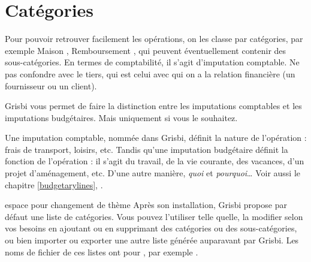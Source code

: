 
\chapter{Catégories\label{categories}}


Pour pouvoir retrouver facilement les opérations, on les classe par catégories, par exemple \og Maison \fg{}, \og Remboursement \fg{}, qui peuvent éventuellement contenir des sous-catégories. En termes de comptabilité, il s'agit d'imputation comptable. Ne pas confondre avec le tiers, qui est celui avec qui on a la relation financière (un fournisseur ou un client).

Grisbi vous permet de faire la distinction entre les imputations comptables et les imputations budgétaires. Mais uniquement si vous le souhaitez.

Une imputation comptable, nommée  dans Grisbi, définit la nature de  l'opération : frais de transport, loisirs, etc. Tandis qu'une imputation budgétaire définit la fonction de l'opération : il s'agit du travail, de la vie courante, des vacances, d'un projet d'aménagement, etc. D'une autre manière, \emph{quoi} et \emph{pourquoi}\ldots{ } Voir aussi le chapitre \vref{budgetarylines}, .

 espace pour changement de thème
Après son installation, Grisbi propose par défaut une liste de catégories. Vous pouvez l'utiliser telle quelle, la modifier selon vos besoins en ajoutant ou en supprimant des catégories ou des sous-catégories, ou bien importer ou exporter une autre liste générée auparavant par Grisbi. Les noms de fichier de ces listes ont pour   , par exemple .


